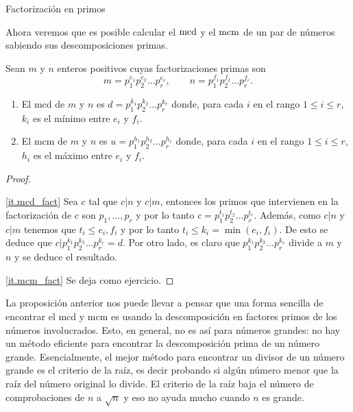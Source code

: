 \begin{section}{Factorización en primos}
%


Ahora veremos que es posible calcular el $\operatorname{mcd}$ y el $\operatorname{mcm}$ de un par de números sabiendo sus descomposiciones primas.

\begin{proposicion}
Sean $m$ y $n$ enteros positivos cuyas factorizaciones primas son
$$
m=p_1^{e_1}p_2^{e_2}\ldots p_r^{e_r},\qquad
n=p_1^{f_1}p_2^{f_2}\ldots p_r^{f_r}.
$$
\begin{enumerate}[label=\textit{\alph*)}]
    \item\label{it.mcd_fact} El mcd de $m$ y $n$ es $d=p_1^{k_1}p_2^{k_2}\ldots p_r^{k_r}$ donde, para cada $i$ en el rango $1\le i \le r$, $k_i$ es el mínimo entre $e_i$ y $f_i$.
    \item\label{it.mcm_fact} El mcm de $m$ y $n$ es $u=p_1^{h_1}p_2^{h_2}\ldots p_r^{h_r}$ donde, para cada $i$ en el rango $1\le i \le r$, $h_i$ es el máximo entre $e_i$ y $f_i$.
    \end{enumerate}
\end{proposicion}
\begin{proof}
\

\ref{it.mcd_fact} Sea $c$ tal que $c|n$ y $c|m$, entonces los primos que intervienen en la factorización de $c$ son $p_1,\ldots,p_r$ y por lo tanto $c =  p_1^{t_1}p_2^{t_2}\ldots p_r^{t_r}$. Además, como $c|n$ y $c|m$ tenemos que $t_i \le e_i,f_i$ y por lo tanto $t_i \le k_i = \min(e_i,f_i)$. De esto se deduce que $c|p_1^{k_1}p_2^{k_2}\ldots p_r^{k_r}=d$. Por otro lado, es claro  que  $p_1^{k_1}p_2^{k_2}\ldots p_r^{k_r}$ divide a $m$ y $n$ y se deduce el resultado.

\ref{it.mcm_fact}  Se deja como ejercicio. 
\end{proof}


\begin{observacion*} La proposición anterior nos puede llevar a pensar que una forma sencilla de encontrar el mcd y mcm  es usando la descomposición en factores primos de los números involucrados. Esto, en general, no es así para números grandes: no hay un método eficiente para encontrar la descomposición prima de un número grande. Esencialmente, el mejor método para encontrar un divisor de un número grande es el criterio de la raíz, es decir probando si algún número menor que la raíz del número original lo divide. El criterio de la raíz baja el número de comprobaciones de $n$ a $\sqrt{n}$ y eso no ayuda mucho cuando $n$ es grande.


\end{observacion*}
\end{section}
